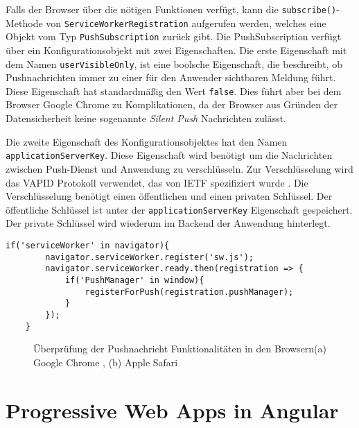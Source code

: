 Falls der Browser über die nötigen Funktionen verfügt, kann die \texttt{subscribe()}-Methode von \texttt{ServiceWorkerRegistration} aufgerufen werden, welches eine Objekt vom Typ \texttt{PushSubscription} zurück gibt. 
Die PushSubscription verfügt über ein Konfigurationsobjekt mit zwei Eigenschaften. Die erste Eigenschaft mit dem Namen \texttt{userVisibleOnly}, ist eine boolsche Eigenschaft, die  beschreibt, ob Pushnachrichten immer zu einer für den Anwender sichtbaren Meldung führt. Diese Eigenschaft hat standardmäßig den Wert \texttt{false}. Dies führt aber bei dem Browser Google Chrome zu Komplikationen, da der Browser aus Gründen der Datensicherheit keine sogenannte \textit{Silent Push} Nachrichten zulässt. 

Die zweite Eigenschaft des Konfigurationsobjektes hat den Namen \texttt{applicationServerKey}. Diese Eigenschaft wird benötigt um die Nachrichten zwischen Push-Dienst und Anwendung zu verschlüsseln. Zur Verschlüsselung wird das \ac{VAPID} Protokoll verwendet, das von IETF spezifiziert wurde \cite{rfc8292}. Die Verschlüsselung benötigt einen öffentlichen und einen privaten Schlüssel. Der öffentliche Schlüssel ist unter der \texttt{applicationServerKey} Eigenschaft gespeichert. Der private Schlüssel wird wiederum im Backend der Anwendung hinterlegt. 

\begin{lstlisting}[caption={Push-Registrierung unter Berücksichtigung der Konzepte von Progressive Enhancement}, label={lst:regPush}, float={!htb}]
    if('serviceWorker' in navigator){
        navigator.serviceWorker.register('sw.js');
        navigator.serviceWorker.ready.then(registration => {
            if('PushManager' in window){
                registerForPush(registration.pushManager);
            }
        });
    }
\end{lstlisting}

\begin{figure}[!htb]
    \centering
    \qquad
    \caption{Überprüfung der Pushnachricht Funktionalitäten in den Browsern(a) Google Chrome  , (b) Apple Safari}
    \label{img:PushManagerBrowser}
\end{figure}


\section{Progressive Web Apps in Angular}


